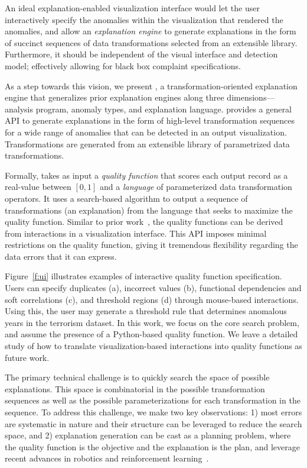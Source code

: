 An ideal explanation-enabled visualization interface would let the user interactively specify the anomalies within the visualization that rendered the anomalies, and allow an {\it explanation engine} to generate explanations in the form of succinct sequences of data transformations selected from an extensible library. Furthermore, it should be independent of the visual interface and detection model; effectively allowing for black box complaint specifications.

As a step towards this vision,  we present \sys, a transformation-oriented explanation engine that generalizes prior explanation engines along three dimensions---analysis program, anomaly types, and explanation language. 
\sys  provides a general API to generate explanations in the form of high-level transformation sequences for a wide range of anomalies that can be detected in an output visualization. Transformations are generated from an extensible library of parametrized data transformations.

Formally, \sys takes as input a {\it quality function} that scores each output record as a real-value between $[0,1]$ and a {\it language} of parameterized data transformation operators.  It uses a search-based algorithm to output a sequence of transformations (an explanation) from the language that seeks to maximize the quality function.  Similar to prior work~\cite{scorpion}, the quality functions can be derived from interactions in a visualization interface.  This API imposes minimal restrictions on the quality function, giving it tremendous flexibility regarding the data errors that it can express.   

Figure~\ref{f:ui} illustrates  examples of interactive quality function specification. Users can specify duplicates (a), incorrect values (b), functional dependencies and soft correlations (c), and threshold regions (d) through mouse-based interactions.   Using this, the user may generate a threshold rule that determines anomalous years in the terrorism dataset.   In this work, we focus on the core search problem, and assume the presence of a Python-based quality function.  We leave a detailed study of how to translate visualization-based interactions into quality functions as future work.  

The primary technical challenge is to quickly search the space of possible explanations.  This space is combinatorial in the possible transformation sequences as well as the possible parameterizations for each transformation in the sequence.  
To address this challenge, we make two key observations: 1) most errors are systematic in nature and their structure can be leveraged to reduce the search space, and 2) explanation generation can be cast as a planning problem, where the quality function is the objective and the explanation is the plan,  and leverage recent advances in robotics and reinforcement learning~\cite{dpm}.


